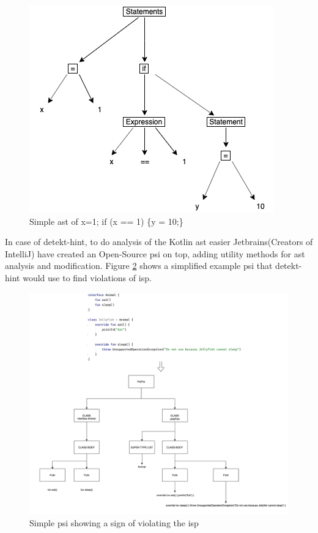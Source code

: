 \documentclass{article}
\begin{document}
\begin{figure}[h!]
	\centering
	\includegraphics[width=\linewidth/2]{report/images/ast.png}
	\caption{Simple \gls{ast} of x=1; if (x == 1) \{y = 10;\}}
	\label{fig:ast}
\end{figure}

In case of detekt-hint, to do analysis of the Kotlin \gls{ast} easier Jetbrains\cite{jetbrains}(Creators of IntelliJ) have created an Open-Source \gls{psi} on top, adding utility methods for \gls{ast} analysis and modification. Figure \ref{fig:psi} shows a simplified example \gls{psi} that detekt-hint would use to find violations of \gls{isp}.

\begin{figure}[h!]
    \centering
    \includegraphics[width=\linewidth]{report/images/psi.png}
    \caption{Simple \gls{psi} showing a sign of violating the \gls{isp}}
    \label{fig:psi}
\end{figure}
\end{document}
